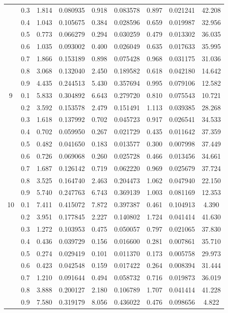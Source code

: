\begin{longtable}{ | c | c || c | c | c | c | c | c | c | }
 & 0.3 & 1.814 & 0.080935 & 0.918 & 0.083578 & 0.897 & 0.021241 & 42.208 \\
 & 0.4 & 1.043 & 0.105675 & 0.384 & 0.028596 & 0.659 & 0.019987 & 32.956 \\
 & 0.5 & 0.773 & 0.066279 & 0.294 & 0.030259 & 0.479 & 0.013302 & 36.035 \\
 & 0.6 & 1.035 & 0.093002 & 0.400 & 0.026049 & 0.635 & 0.017633 & 35.995 \\
 & 0.7 & 1.866 & 0.153189 & 0.898 & 0.075428 & 0.968 & 0.031175 & 31.036 \\
 & 0.8 & 3.068 & 0.132040 & 2.450 & 0.189582 & 0.618 & 0.042180 & 14.642 \\
 & 0.9 & 4.435 & 0.244513 & 5.430 & 0.357694 & 0.995 & 0.079106 & 12.582 \\
 \hline
\multirow{9}{*}{9} & 0.1 & 5.833 & 0.304892 & 6.643 & 0.279720 & 0.810 & 0.075543 & 10.721 \\
 & 0.2 & 3.592 & 0.153578 & 2.479 & 0.151491 & 1.113 & 0.039385 & 28.268 \\
 & 0.3 & 1.618 & 0.137992 & 0.702 & 0.045723 & 0.917 & 0.026541 & 34.533 \\
 & 0.4 & 0.702 & 0.059950 & 0.267 & 0.021729 & 0.435 & 0.011642 & 37.359 \\
 & 0.5 & 0.482 & 0.041650 & 0.183 & 0.013577 & 0.300 & 0.007998 & 37.449 \\
 & 0.6 & 0.726 & 0.069068 & 0.260 & 0.025728 & 0.466 & 0.013456 & 34.661 \\
 & 0.7 & 1.687 & 0.126142 & 0.719 & 0.062220 & 0.969 & 0.025679 & 37.724 \\
 & 0.8 & 3.525 & 0.164740 & 2.463 & 0.204473 & 1.062 & 0.047940 & 22.150 \\
 & 0.9 & 5.740 & 0.247763 & 6.743 & 0.369139 & 1.003 & 0.081169 & 12.353 \\
 \hline
\multirow{9}{*}{10} & 0.1 & 7.411 & 0.415072 & 7.872 & 0.397387 & 0.461 & 0.104913 & 4.390 \\
 & 0.2 & 3.951 & 0.177845 & 2.227 & 0.140802 & 1.724 & 0.041414 & 41.630 \\
 & 0.3 & 1.272 & 0.103953 & 0.475 & 0.050057 & 0.797 & 0.021065 & 37.830 \\
 & 0.4 & 0.436 & 0.039729 & 0.156 & 0.016600 & 0.281 & 0.007861 & 35.710 \\
 & 0.5 & 0.274 & 0.029419 & 0.101 & 0.011370 & 0.173 & 0.005758 & 29.973 \\
 & 0.6 & 0.423 & 0.042548 & 0.159 & 0.017422 & 0.264 & 0.008394 & 31.444 \\
 & 0.7 & 1.210 & 0.091644 & 0.494 & 0.058732 & 0.716 & 0.019873 & 36.019 \\
 & 0.8 & 3.888 & 0.200127 & 2.180 & 0.106789 & 1.707 & 0.041414 & 41.228 \\
 & 0.9 & 7.580 & 0.319179 & 8.056 & 0.436022 & 0.476 & 0.098656 & 4.822 \\
 \hline
\hline
\end{longtable}
 
 
